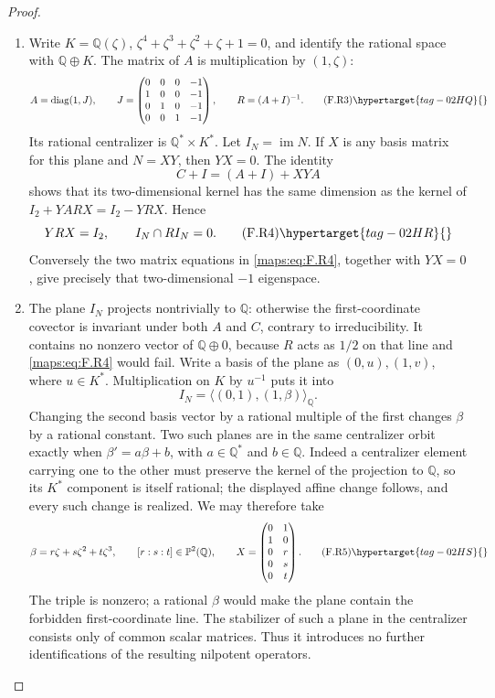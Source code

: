 \begin{proof}
\begin{enumerate}[label={$\langle1\rangle$\arabic*.}]
\item Write $K=\mathbb Q(\zeta)$, $\zeta^4+\zeta^3+\zeta^2+
\zeta+1=0$, and identify the rational space with
$\mathbb Q\oplus K$.  The matrix of $A$ is multiplication by
$(1,\zeta)$:
\[
 A=\operatorname{diag}(1,J),\qquad
 J=\begin{pmatrix}
 0&0&0&-1\\1&0&0&-1\\0&1&0&-1\\0&0&1&-1
 \end{pmatrix},\qquad R=(A+I)^{-1}.
 \tag{F.R3}\hypertarget{tag-02HQ}{}\label{maps:eq:F.R3}
\]
Its rational centralizer is $\mathbb Q^*\times K^*$.
Let $I_N=\operatorname{im}N$.  If $X$ is any basis matrix
for this plane and $N=XY$, then $YX=0$.
The identity
\[
 C+I=(A+I)+XYA
\]
shows that its two-dimensional kernel has the same dimension
as the kernel of
$I_2+YARX=I_2-YRX$.  Hence
\[
 YRX=I_2,
 \qquad I_N\cap RI_N=0.
 \tag{F.R4}\hypertarget{tag-02HR}{}\label{maps:eq:F.R4}
\]
Conversely the two matrix equations in \eqref{maps:eq:F.R4}, together with
$YX=0$, give precisely that two-dimensional $-1$ eigenspace.

\item The plane $I_N$ projects nontrivially to $\mathbb Q$:
otherwise the first-coordinate covector is invariant under
both $A$ and $C$, contrary to irreducibility.
It contains no nonzero vector of $\mathbb Q\oplus0$,
because $R$ acts as $1/2$ on that line and \eqref{maps:eq:F.R4} would fail.
Write a basis of the plane as $(0,u),(1,v)$, where
$u\in K^*$.  Multiplication on $K$ by $u^{-1}$ puts it into
\[
 I_N=\langle(0,1),(1,\beta)\rangle_{\mathbb Q}.
\]
Changing the second basis vector by a rational multiple of
the first changes $\beta$ by a rational constant.
Two such planes are in the same centralizer orbit exactly
when $\beta'=a\beta+b$, with $a\in\mathbb Q^*$ and
$b\in\mathbb Q$.  Indeed a centralizer element carrying
one to the other must preserve the kernel of the projection
to $\mathbb Q$, so its $K^*$ component is itself rational;
the displayed affine change follows, and every such change
is realized.  We may therefore take
\[
 \beta=r\zeta+s\zeta^2+t\zeta^3,
 \qquad [r:s:t]\in\mathbb P^2(\mathbb Q),
 \qquad
 X=\begin{pmatrix}0&1\\1&0\\0&r\\0&s\\0&t\end{pmatrix}.
 \tag{F.R5}\hypertarget{tag-02HS}{}\label{maps:eq:F.R5}
\]
The triple is nonzero; a rational $\beta$ would make the
plane contain the forbidden first-coordinate line.
The stabilizer of such a plane in the centralizer consists
only of common scalar matrices.  Thus it introduces no
further identifications of the resulting nilpotent operators.


\end{enumerate}
\end{proof}
